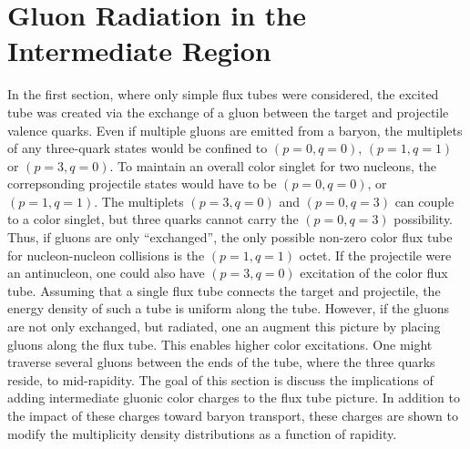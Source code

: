 \documentclass[aps, prc, 12pt, nofootinbib, showpacs, superscriptaddress, tightenlines, groupedaddress]{revtex4-2}
\begin{document}
\section{Gluon Radiation in the Intermediate Region}\label{sec:gluonradiation}

In the first section, where only simple flux tubes were considered, the excited tube was created via the exchange of a gluon between the target and projectile valence quarks. Even if multiple gluons are emitted from a baryon, the multiplets of any three-quark states would be confined to $(p=0,q=0)$, $(p=1,q=1)$ or $(p=3,q=0)$. To maintain an overall color singlet for two nucleons, the correpsonding projectile states would have to be $(p=0,q=0)$, or $(p=1,q=1)$. The multiplets $(p=3,q=0)$ and $(p=0,q=3)$ can couple to a color singlet, but three quarks cannot carry the $(p=0,q=3)$ possibility. Thus, if gluons are only ``exchanged'', the only possible non-zero color flux tube for nucleon-nucleon collisions is the $(p=1,q=1)$ octet. If the projectile were an antinucleon, one could also have $(p=3,q=0)$ excitation of the color flux tube. Assuming that a single flux tube connects the target and projectile, the energy density of such a tube is uniform along the tube. However, if the gluons are not only exchanged, but radiated, one an augment this picture by placing gluons along the flux tube. This enables higher color excitations. One might traverse several gluons between the ends of the tube, where the three quarks reside, to mid-rapidity. The goal of this section is discuss the implications of adding intermediate gluonic color charges to the flux tube picture. In addition to the impact of these charges toward baryon transport, these charges are shown to modify the multiplicity density distributions as a function of rapidity. 
\end{document}
